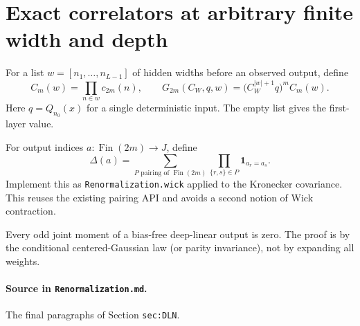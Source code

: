 \section{Exact correlators at arbitrary finite width and depth}

\begin{definition}
\label{def:dln:amplitude}
For a list $w=[n_1,\ldots,n_{L-1}]$ of hidden widths before an observed output, define
\[
 C_m(w)=\prod_{n\in w}c_{2m}(n),\qquad
 G_{2m}(C_W,q,w)=\big(C_W^{|w|+1}q\big)^m C_m(w).
\]
Here $q=Q_{n_0}(x)$ for a single deterministic input.  The empty list gives the first-layer value.
\end{definition}

\begin{definition}
\label{def:dln:pairingTensor}
For output indices $a:\operatorname{Fin}(2m)\to J$, define
\[
 \Delta(a)=\sum_{P\text{ pairing of }\operatorname{Fin}(2m)}
   \prod_{\{r,s\}\in P}\mathbf 1_{a_r=a_s}.
\]
Implement this as \texttt{Renormalization.wick} applied to the Kronecker covariance.  This reuses
the existing pairing API and avoids a second notion of Wick contraction.
\end{definition}

\begin{theorem}
\label{thm:dln:oddMoments}
Every odd joint moment of a bias-free deep-linear output is zero.  The proof is by the conditional
centered-Gaussian law (or parity invariance), not by expanding all weights.

\paragraph{Source in \texttt{Renormalization.md}.}
The final paragraphs of Section \texttt{sec:DLN}.
\end{theorem}


